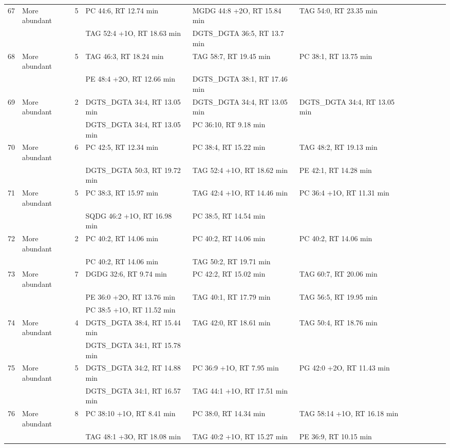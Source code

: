 \begin{landscape}
\begin{footnotesize}
\begin{singlespace}
\begin{flushleft}
\begin{longtable}{ Lp{.03\linewidth} Lp{.12\linewidth} Lp{.03\linewidth} Lp{.24\linewidth} Lp{.24\linewidth} Lp{.24\linewidth} }
67 & More abundant & 5 & PC 44:6, RT 12.74 min & MGDG 44:8 +2O, RT 15.84 min & TAG 54:0, RT 23.35 min \\
 &  &  & TAG 52:4 +1O, RT 18.63 min & DGTS\_DGTA 36:5, RT 13.7 min &  \\
68 & More abundant & 5 & TAG 46:3, RT 18.24 min & TAG 58:7, RT 19.45 min & PC 38:1, RT 13.75 min \\
 &  &  & PE 48:4 +2O, RT 12.66 min & DGTS\_DGTA 38:1, RT 17.46 min &  \\
69 & More abundant & 2 & DGTS\_DGTA 34:4, RT 13.05 min & DGTS\_DGTA 34:4, RT 13.05 min & DGTS\_DGTA 34:4, RT 13.05 min \\
 &  &  & DGTS\_DGTA 34:4, RT 13.05 min & PC 36:10, RT 9.18 min &  \\
70 & More abundant & 6 & PC 42:5, RT 12.34 min & PC 38:4, RT 15.22 min & TAG 48:2, RT 19.13 min \\
 &  &  & DGTS\_DGTA 50:3, RT 19.72 min & TAG 52:4 +1O, RT 18.62 min & PE 42:1, RT 14.28 min \\
71 & More abundant & 5 & PC 38:3, RT 15.97 min & TAG 42:4 +1O, RT 14.46 min & PC 36:4 +1O, RT 11.31 min \\
 &  &  & SQDG 46:2 +1O, RT 16.98 min & PC 38:5, RT 14.54 min &  \\
72 & More abundant & 2 & PC 40:2, RT 14.06 min & PC 40:2, RT 14.06 min & PC 40:2, RT 14.06 min \\
 &  &  & PC 40:2, RT 14.06 min & TAG 50:2, RT 19.71 min &  \\
73 & More abundant & 7 & DGDG 32:6, RT 9.74 min & PC 42:2, RT 15.02 min & TAG 60:7, RT 20.06 min \\
 &  &  & PE 36:0 +2O, RT 13.76 min & TAG 40:1, RT 17.79 min & TAG 56:5, RT 19.95 min \\
 &  &  & PC 38:5 +1O, RT 11.52 min &  &  \\
74 & More abundant & 4 & DGTS\_DGTA 38:4, RT 15.44 min & TAG 42:0, RT 18.61 min & TAG 50:4, RT 18.76 min \\
 &  &  & DGTS\_DGTA 34:1, RT 15.78 min &  &  \\
75 & More abundant & 5 & DGTS\_DGTA 34:2, RT 14.88 min & PC 36:9 +1O, RT 7.95 min & PG 42:0 +2O, RT 11.43 min \\
 &  &  & DGTS\_DGTA 34:1, RT 16.57 min & TAG 44:1 +1O, RT 17.51 min &  \\
76 & More abundant & 8 & PC 38:10 +1O, RT 8.41 min & PC 38:0, RT 14.34 min & TAG 58:14 +1O, RT 16.18 min \\
 &  &  & TAG 48:1 +3O, RT 18.08 min & TAG 40:2 +1O, RT 15.27 min & PE 36:9, RT 10.15 min \\

\end{longtable}
\end{flushleft}
\end{singlespace}
\end{footnotesize}
\end{landscape}
